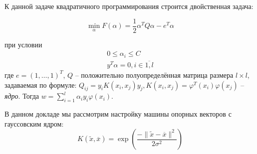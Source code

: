 \documentclass[14pt,a4paper,article]{ncc}
\numberwithin{equation}{subsection}
\begin{document}
К данной задаче квадратичного программирования строится двойственная задача:

\begin{equation}
\min_{\alpha} F(\alpha) = \frac{1}{2}\alpha^TQ\alpha -e^T \alpha
\end{equation}

при условии
\begin{align}
0 \leq \alpha_i \leq C \\
y^T \alpha = 0, i \in \overline{1,l}
\end{align}
где $e=(1, \dots, 1)^T$, $Q$ -- положительно полуопределённая матрица размера $l \times l$, задаваемая по формуле: $Q_{ij}=y_i K(x_i, x_j) y_j, K(x_i, x_j) = \varphi^T(x_i) \varphi(x_j)$ -- \textit{ядро}. Тогда $w= \displaystyle \sum_{i = 1}^{l} \alpha_i y_i \varphi(x_i)$.

В данном докладе мы рассмотрим настройку машины опорных векторов с гауссовским ядром:
\begin{equation}
K(\tilde{x}, \overline{x})= \exp \left( \frac{-\| \tilde{x} - \overline{x} \|^2}{2 \sigma ^2} \right)
\end{equation}





\end{document}
